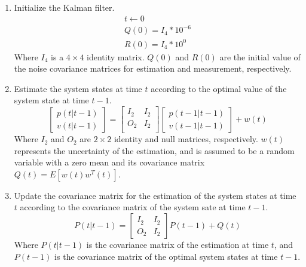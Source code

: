 \begin{enumerate}
	\item Initialize the Kalman filter.
	\begin{eqnarray*}
		t \leftarrow 0 \\
		Q(0) = I_4 * 10^{-6} \\
		R(0) = I_4 * 10^{0}
	\end{eqnarray*}
	Where \(I_4\) is a \(4 \times 4\) identity matrix. \(Q(0)\) and \(R(0)\) are the initial value of the noise covariance matrices for estimation and measurement, respectively. 
	\item Estimate the system states at time \(t\) according to the optimal value of the system state at time \(t-1\).
	\begin{equation}
		\left[
		\begin{matrix}
		p(t|t-1) \\
		v(t|t-1)
		\end{matrix}
		\right] =
		\begin{bmatrix}
		I_2&I_2\\
		O_2&I_2 \\
		\end{bmatrix}
		\begin{bmatrix}
		p(t-1|t-1) \\
		v(t-1|t-1)
		\end{bmatrix}
		+ w(t)
	\end{equation} 
	Where \(I_2\) and \(O_2\) are \(2 \times 2\) identity and null matrices, respectively. \(w(t)\) represents the uncertainty of the estimation, and is assumed to be a random variable with a zero mean and its covariance matrix \(Q(t) = E[w(t)w^T(t)]\).
	
	\item Update the covariance matrix for the estimation of the system states at time \(t\) according to the covariance matrix of the system sate at time \(t-1\). 
	\begin{equation}
		P(t|t-1) = \begin{bmatrix}
		I_2&I_2 \\
		O_2&I_2
		\end{bmatrix} P(t-1) + Q(t)
	\end{equation}
	Where \(P(t|t-1)\) is the covariance matrix of the estimation at time \(t\), and \(P(t-1)\) is the covariance matrix of the optimal system states at time \(t-1\).
	

\end{enumerate}
